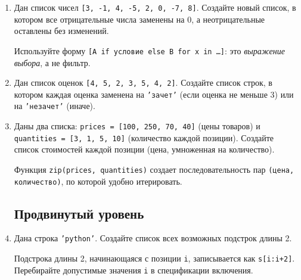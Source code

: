 \documentclass[a4,12pt]{article}
\theoremstyle{remark}
\begin{document}
\begin{enumerate}
    \begin{exercisehint}
        Метод \texttt{.split(' ')} с явным разделителем-пробелом, в отличие от
        \texttt{.split()} без аргументов, сохраняет в результате пустые строки
        на месте подряд идущих пробелов. Отфильтровать их можно условием
        \texttt{if w} в включении.
    \end{exercisehint}

    \item Дан список чисел \texttt{[3, -1, 4, -5, 2, 0, -7, 8]}.
    Создайте новый список, в котором все отрицательные числа заменены на 0,
    а неотрицательные оставлены без изменений.

    \begin{exercisehint}
        Используйте форму \texttt{[A if условие else B for x in \ldots]}:
        это \emph{выражение выбора}, а не фильтр.
    \end{exercisehint}

    \item Дан список оценок \texttt{[4, 5, 2, 3, 5, 4, 2]}.
    Создайте список строк, в котором каждая оценка заменена на \texttt{'зачет'}
    (если оценка не меньше 3) или на \texttt{'незачет'} (иначе).

    \item Даны два списка: \texttt{prices = [100, 250, 70, 40]} (цены товаров)
    и \texttt{quantities = [3, 1, 5, 10]} (количество каждой позиции).
    Создайте список стоимостей каждой позиции (цена, умноженная на количество).

    \begin{exercisehint}
        Функция \texttt{zip(prices, quantities)} создает последовательность
        пар \texttt{(цена, количество)}, по которой удобно итерировать.
    \end{exercisehint}

    \subsection*{Продвинутый уровень}
    \item Дана строка \texttt{'python'}. Создайте список всех возможных подстрок длины 2.

    \begin{exercisehint}
        Подстрока длины 2, начинающаяся с позиции \texttt{i}, записывается как \texttt{s[i:i+2]}.
        Перебирайте допустимые значения \texttt{i} в спецификации включения.
    \end{exercisehint}


\end{enumerate}
\end{document}
